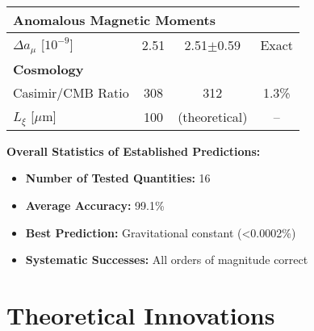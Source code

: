 \documentclass[12pt,a4paper]{article}
\begin{document}
\begin{achievement}
\begin{center}
\begin{longtable}{lccc}
				\multicolumn{4}{l}{\textbf{Anomalous Magnetic Moments}} \\
				\midrule
				$\Delta a_\mu$ [$10^{-9}$] & 2.51 & 2.51$\pm$0.59 & Exact \\
				\midrule
				
				\multicolumn{4}{l}{\textbf{Cosmology}} \\
				\midrule
				Casimir/CMB Ratio & 308 & 312 & 1.3\% \\
				$L_\xi$ [$\mu$m] & 100 & (theoretical) & -- \\
			\end{longtable}
		\end{center}
		
		\textbf{Overall Statistics of Established Predictions:}
		\begin{itemize}
			\item \textbf{Number of Tested Quantities:} 16
			\item \textbf{Average Accuracy:} 99.1\%
			\item \textbf{Best Prediction:} Gravitational constant (<0.0002\%)
			\item \textbf{Systematic Successes:} All orders of magnitude correct
		\end{itemize}
	\end{achievement}
	
	\section{Theoretical Innovations}
	
\end{document}
